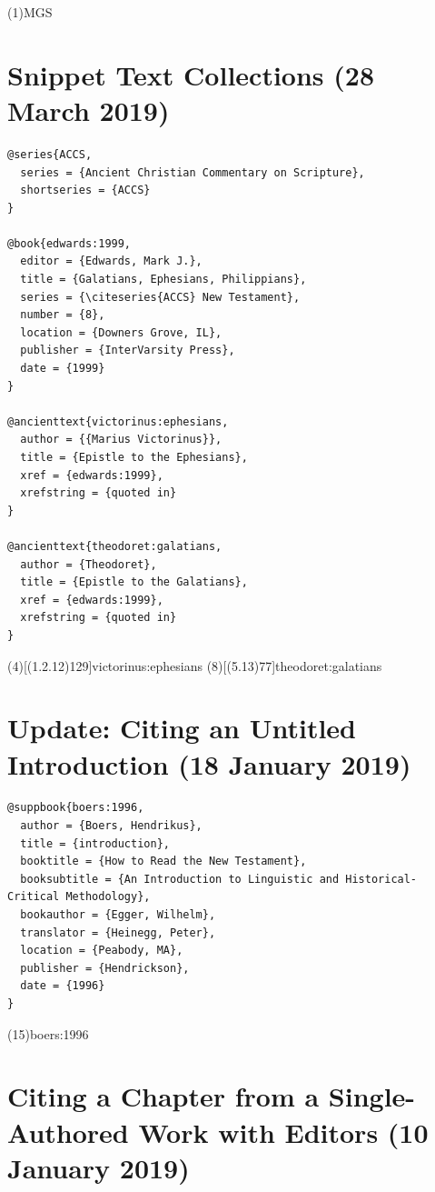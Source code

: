 \documentclass[a4paper]{article}
\begin{document}
\examplecite(1){MGS}
\exampleabbreviations
{}

\section{Snippet Text Collections (28 March 2019)}

\begin{verbatim}
@series{ACCS,
  series = {Ancient Christian Commentary on Scripture},
  shortseries = {ACCS}
}

@book{edwards:1999,
  editor = {Edwards, Mark J.},
  title = {Galatians, Ephesians, Philippians},
  series = {\citeseries{ACCS} New Testament},
  number = {8},
  location = {Downers Grove, IL},
  publisher = {InterVarsity Press},
  date = {1999}
}

@ancienttext{victorinus:ephesians,
  author = {{Marius Victorinus}},
  title = {Epistle to the Ephesians},
  xref = {edwards:1999},
  xrefstring = {quoted in}
}

@ancienttext{theodoret:galatians,
  author = {Theodoret},
  title = {Epistle to the Galatians},
  xref = {edwards:1999},
  xrefstring = {quoted in}
}
\end{verbatim}

\examplecite(4)[(1.2.12)129]{victorinus:ephesians}
\examplecite(8)[(5.13)77]{theodoret:galatians}
\nocite{ACCS}
\exampleabbreviations
\examplebibliography
{}

\section{Update: Citing an Untitled Introduction (18 January 2019)}

\begin{verbatim}
@suppbook{boers:1996,
  author = {Boers, Hendrikus},
  title = {introduction},
  booktitle = {How to Read the New Testament},
  booksubtitle = {An Introduction to Linguistic and Historical-Critical Methodology},
  bookauthor = {Egger, Wilhelm},
  translator = {Heinegg, Peter},
  location = {Peabody, MA},
  publisher = {Hendrickson},
  date = {1996}
}
\end{verbatim}

\examplecite(15){boers:1996}
\examplebibliography
{}

\section{Citing a Chapter from a Single-Authored Work with Editors (10 January 2019)}
\end{document}
